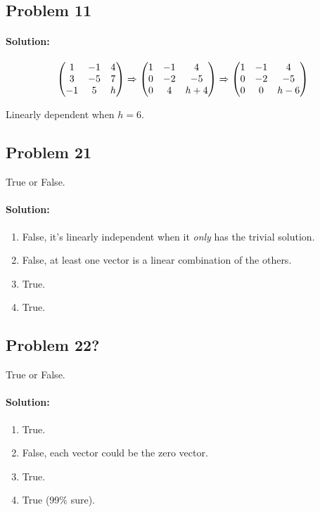 \documentclass[11pt, notitlepage]{report}
\newenvironment{solution}{\paragraph{\small Solution:}}{\hfill}
\begin{document}
\subsection{Problem 11}

\begin{solution}

\[
\left(\begin{matrix}{}
  1&-1 &4 \\
  3&-5 &7 \\
  -1&5 &h
\end{matrix}\right)
\xRightarrow{}
\left(\begin{matrix}{}
  1&-1 &4 \\
  0&-2 &-5 \\
  0&4 &h+4
\end{matrix}\right)
\xRightarrow{}
\left(\begin{matrix}{}
  1&-1 &4 \\
  0&-2 &-5 \\
  0&0 &h-6
\end{matrix}\right)
\]

Linearly dependent when $h=6$.
\end{solution}

\subsection{Problem 21}
True or False.
\begin{solution}
\begin{enumerate}[label=\alph*.)]
	\item False, it's linearly independent when it \textit{only} has the trivial solution.
	\item False, at least one vector is a linear combination of the others.
	\item True.
	\item True.
\end{enumerate}
\end{solution}

\subsection{Problem 22?}
True or False.
\begin{solution}
\begin{enumerate}[label=\alph*.)]
	\item True.
	\item False, each vector could be the zero vector.
	\item True.
	\item True (99\% sure).
\end{enumerate}
\end{solution}
\end{document}
